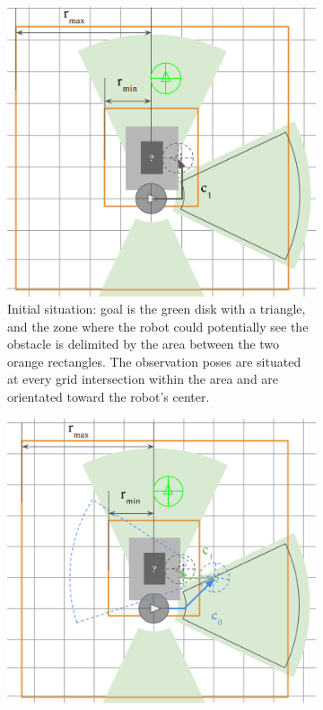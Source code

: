 \begin{figure}[H]
\centering
\begin{subfigure}{.45\textwidth}
  \centering
  \includegraphics[width=\linewidth]{Figures/Observation_Proposition/Observation_01.png}
  \caption{Initial situation: goal is the green disk with a triangle, and the zone where the robot could potentially see the obstacle is delimited by the area between the two orange rectangles. The observation poses are situated at every grid intersection within the area and are orientated toward the robot's center.}
  \label{fig:observation_01}
\end{subfigure}\hspace*{\fill}
\begin{subfigure}{.45\textwidth}
  \centering
  \includegraphics[width=\linewidth]{Figures/Observation_Proposition/Observation_02.png}

\end{subfigure}
\end{figure}
